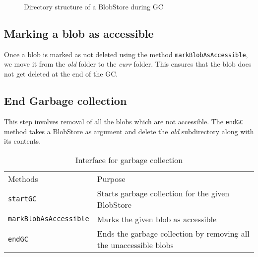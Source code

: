 \begin{figure}[hbt]
  \caption{Directory structure of a BlobStore during GC}
  \label{fig:blobstore-dirstructure-gc}
\end{figure}

\subsection{Marking a blob as accessible}
Once a blob is marked as not deleted using the method \texttt{markBlobAsAccessible}, we move it from the \textit{old} folder to the \textit{curr} folder. This ensures that the blob does not get deleted at the end of the GC.

\subsection{End Garbage collection}
This step involves removal of all the blobs which are not accessible. The \texttt{endGC} method takes a BlobStore as argument and delete the \textit{old} subdirectory along with its contents.

\begin{table}[hbt]
\caption{Interface for garbage collection}
\label{tab:interface-gc}
\begin{center}
  \begin{tabularx}{0.91\textwidth}{lX}
    \hline\noalign{\smallskip}
    Methods & Purpose \\
    \noalign{\smallskip}
    \hline
    \noalign{\smallskip}
    \texttt{startGC} & Starts garbage collection for the given BlobStore\\
    \texttt{markBlobAsAccessible} & Marks the given blob as accessible\\
    \texttt{endGC} & Ends the garbage collection by removing all the unaccessible blobs\\
    \hline
  \end{tabularx}
\end{center}
\end{table}
